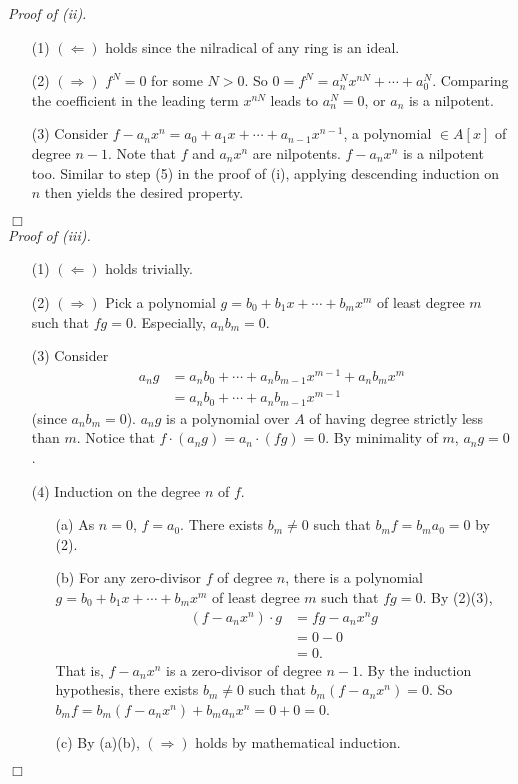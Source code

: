 \documentclass{article}
\begin{document}
\emph{Proof of (ii).}
\begin{enumerate}
\item[(1)]
$(\Longleftarrow)$ holds since the nilradical of any ring is an ideal.
\item[(2)]
$(\Longrightarrow)$ $f^N = 0$ for some $N > 0$.
So $0 = f^N = a_n^N x^{nN} + \cdots + a_0^N$.
Comparing the coefficient in the leading term $x^{nN}$ leads to $a_n^N = 0$,
or $a_n$ is a nilpotent.
\item[(3)]
Consider $f - a_n x^n = a_0 + a_1 x + \cdots + a_{n-1} x^{n-1}$,
a polynomial $\in A[x]$ of degree $n-1$.
Note that $f$ and $a_n x^n$ are nilpotents.
$f - a_n x^n$ is a nilpotent too.
Similar to step (5) in the proof of (i),
applying descending induction on $n$ then yields the desired property.
\end{enumerate}
$\Box$ \\

\emph{Proof of (iii).}
\begin{enumerate}
\item[(1)]
$(\Longleftarrow)$ holds trivially.
\item[(2)]
$(\Longrightarrow)$
Pick a polynomial $g = b_0 + b_1 x + \cdots + b_m x^m$
of least degree $m$ such that $fg = 0$.
Especially, $a_n b_m = 0$.
\item[(3)]
Consider
\begin{align*}
a_n g
&= a_n b_0 + \cdots + a_n b_{m-1} x^{m-1} + a_n b_m x^m \\
&= a_n b_0 + \cdots + a_n b_{m-1} x^{m-1}
\end{align*}
(since $a_n b_m = 0$).
$a_n g$ is a polynomial over $A$ of having degree strictly less than $m$.
Notice that $f \cdot (a_n g) = a_n \cdot (fg)= 0$.
By minimality of $m$, $a_n g = 0$.
\item[(4)]
Induction on the degree $n$ of $f$.
\begin{enumerate}
\item[(a)]
As $n = 0$, $f = a_0$. There exists $b_m \neq 0$ such that $b_m f = b_m a_0 = 0$ by (2).
\item[(b)]
For any zero-divisor $f$ of degree $n$,
there is a polynomial $g = b_0 + b_1 x + \cdots + b_m x^m$
of least degree $m$ such that $fg = 0$. By (2)(3),
\begin{align*}
(f - a_n x^n) \cdot g
&= fg - a_n x^n g \\
&= 0 - 0 \\
&= 0.
\end{align*}
That is, $f - a_n x^n$ is a zero-divisor of degree $n-1$.
By the induction hypothesis,
there exists $b_m \neq 0$ such that $b_{m}(f - a_n x^n) = 0$.
So $b_m f = b_{m}(f - a_n x^n) + b_m a_n x^n = 0 + 0 = 0$.
\item[(c)]
By (a)(b), $(\Longrightarrow)$ holds by mathematical induction.
\end{enumerate}
\end{enumerate}
$\Box$ \\
\end{document}
